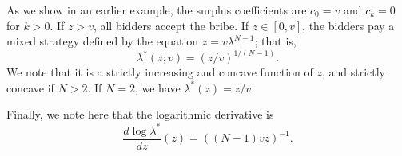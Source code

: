 \begin{example}

  As we show in an earlier example, the surplus coefficients are $c_0 = v$ and $c_k=0$ for $k>0$.
  If $z>v$, all bidders accept the bribe.
  If $z\in[0,v]$, the bidders pay a mixed strategy defined by the equation $z=v\lambda^{N-1}$; that is,
  \[
    \lambda^*(z; v) = (z/v)^{1/(N-1)}.
  \] 
  We note that it is a strictly increasing and concave function of $z$, and strictly concave if $N>2$.
  If $N=2$, we have $\lambda^*(z)=z/v$.
  
  Finally, we note here that the logarithmic derivative is 
  \[
    \frac{d\log \lambda^*}{dz}(z)= ((N-1)vz)^{-1}.
  \]

\end{example}

\begin{comment}

\begin{question}What happens when obtain large $N$ by adding a long tail of bidders with low $\tilde{v}$?\end{question}

\begin{example}[Bidder reputation]

  A general rule of thumb is that the more information the adversary has, the cheaper it becomes to bribe.
  For example, consider the case that bidders are partitioned into two sets: a `high reputation' set $[N]$ of bidders that handle most uncensored requests, and a long tail 'low reputation' set $[M]$ that comes into play when the high reputation set has been bought off.
  The high reputation set may be quite small; for example, $N=2$ in PBS today (over 90\% of blocks are handled by just two entities).

  Suppose that types and strategies are symmetric within each of the two sets, and that $v_N>v_M$ almost surely. 
  We are allowed two bribe amounts $z_N$ and $z_M$ and strategic plans $\lambda_N^*(\tilde{v},z_N)$ and $\lambda_M^*(\tilde{v},z_M)$.
  Censorship succeeds with probability $p=\bar\lambda_N(z_N)^N\bar\lambda_M(z_M)^M$.


\end{example}

\end{comment}































